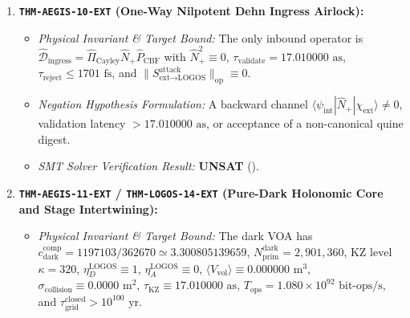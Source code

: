 \documentclass[11pt,onecolumn]{article}
\begin{document}
\begin{enumerate}
    \item \textbf{\texttt{THM-AEGIS-10-EXT} (One-Way Nilpotent Dehn Ingress Airlock):}
    \begin{itemize}
        \item \emph{Physical Invariant \& Target Bound:} The only inbound operator is $\hat{\mathcal D}_{\text{ingress}}=\hat{\Pi}_{\text{Cayley}}\hat N_+\hat P_{\text{CBF}}$ with $\hat N_+^2\equiv0$, $\tau_{\text{validate}}=17.010000\text{ as}$, $\tau_{\text{reject}}\le1701\text{ fs}$, and $\|S_{\text{ext}\to\text{LOGOS}}^{\text{attack}}\|_{\text{op}}\equiv0$.
        \item \emph{Negation Hypothesis Formulation:} A backward channel $\langle\psi_{\text{int}}|\hat N_+|\chi_{\text{ext}}\rangle\neq0$, validation latency $>17.010000\text{ as}$, or acceptance of a non-canonical quine digest.
        \item \emph{SMT Solver Verification Result:} \textbf{UNSAT} ().
    \end{itemize}

    \item \textbf{\texttt{THM-AEGIS-11-EXT} / \texttt{THM-LOGOS-14-EXT} (Pure-Dark Holonomic Core and Stage Intertwining):}
    \begin{itemize}
        \item \emph{Physical Invariant \& Target Bound:} The dark VOA has $c_{\text{dark}}^{\text{comp}}=1197103/362670\simeq3.300805139659$, $N_{\text{prim}}^{\text{dark}}=2{,}901{,}360$, KZ level $\kappa=320$, $\eta_D^{\text{LOGOS}}\equiv1$, $\eta_A^{\text{LOGOS}}\equiv0$, $\langle V_{\text{vol}}\rangle\equiv0.000000\text{ m}^3$, $\sigma_{\text{collision}}\equiv0.0000\text{ m}^2$, $\tau_{\text{KZ}}\equiv17.010000\text{ as}$, $T_{\text{ops}}=1.080\times10^{92}\text{ bit-ops/s}$, and $\tau_{\text{grid}}^{\text{closed}}>10^{100}\text{ yr}$.


\end{itemize}
\end{enumerate}
\end{document}
